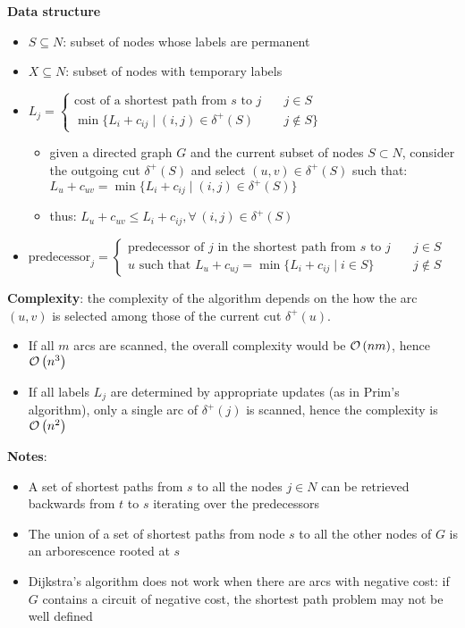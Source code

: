 \documentclass[english]{article}
\begin{document}
\bigskip
\textbf{Data structure}
\begin{itemize}
  \item \(S \subseteq N\): subset of nodes whose labels are permanent
  \item \(X \subseteq N\): subset of nodes with temporary labels
  \item \(L_j = \begin{cases} \text{cost of a shortest path from } s \text{ to } j \quad & j \in S \\ \min\{L_i + c_{ij} \mid   (i, j) \in \delta^+(S) & j \notin S\}\end{cases}\)
        \begin{itemize}[label=\(\rightarrow\)]
          \item given a directed graph \(G\) and the current subset of nodes \(S \subset N\), consider the outgoing cut \(\delta^+(S)\) and select \((u, v) \in \delta^+(S)\) such that: \( L_u + c_{uv} = \min\{L_i + c_{ij} \mid   (i, j) \in \delta^+ (S)\}\)
          \item thus: \(L_u + c_{uv} \leq L_i + c_{ij}, \forall \, (i, j) \in \delta^+(S)\)
        \end{itemize}
  \item \(\text{predecessor}_j = \begin{cases}\text{predecessor of } j \text{ in the shortest path from } s \text{ to } j \quad& j \in S \\ u \text{ such that } L_u + c_{uj} = \min\{L_i + c_{ij} \mid   i \in S\} & j \notin S\end{cases}\)
\end{itemize}

\bigskip
\textbf{Complexity}:
the complexity of the algorithm depends on the how the arc \((u, v)\) is selected among those of the current cut \(\delta^+(u)\).
\begin{itemize}
  \item If all \(m\) arcs are scanned, the overall complexity would be \(\mathcal{O}\left(nm\right)\), hence \(\mathcal{O}\left(n^3\right)\)
  \item If all labels \(L_j\) are determined by appropriate updates (as in Prim's algorithm), only a single arc of \(\delta^+(j)\) is scanned, hence the complexity is \(\mathcal{O}\left(n^2\right)\)
\end{itemize}

\bigskip
\textbf{Notes}:
\begin{itemize}
  \item A set of shortest paths from \(s\) to all the nodes \(j \in N\) can be retrieved backwards from \(t\) to \(s\) iterating over the predecessors
  \item The union of a set of shortest paths from node \(s\) to all the other nodes of \(G\) is an arborescence rooted at \(s\)
  \item Dijkstra's algorithm does not work when there are arcs with negative cost: if \(G\) contains a circuit of negative cost, the shortest path problem may not be well defined
\end{itemize}
\end{document}
